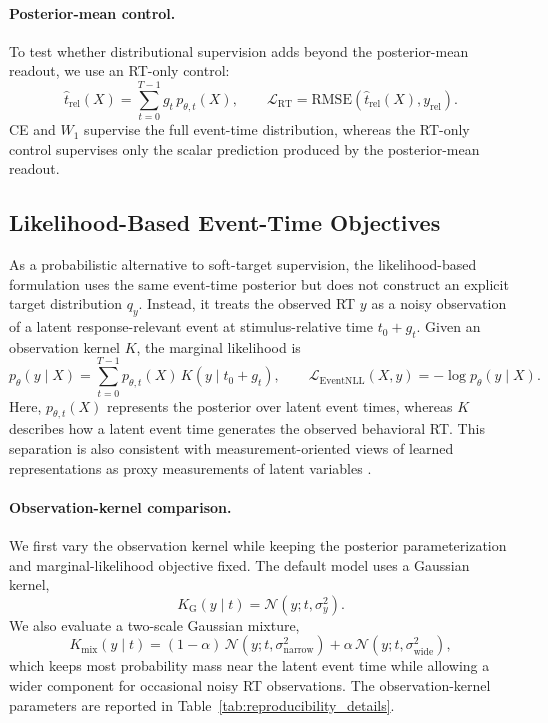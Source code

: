 \documentclass[12pt]{article}
\begin{document}
\paragraph{Posterior-mean control.}
To test whether distributional supervision adds beyond the posterior-mean
readout, we use an RT-only control:
\begin{equation}
\hat t_{\mathrm{rel}}(X)
=\sum_{t=0}^{T-1}g_t\,p_{\theta,t}(X),\qquad
\mathcal{L}_{\mathrm{RT}}
=\mathrm{RMSE}\!\left(\hat t_{\mathrm{rel}}(X),y_{\mathrm{rel}}\right).
\end{equation}
CE and $W_1$ supervise the full event-time distribution, whereas the RT-only
control supervises only the scalar prediction produced by the posterior-mean
readout.

\subsection{Likelihood-Based Event-Time Objectives}
\label{sec:event_nll}

As a probabilistic alternative to soft-target supervision, the likelihood-based
formulation uses the same event-time posterior but does not construct an explicit
target distribution $q_y$. Instead, it treats the observed RT $y$ as a noisy
observation of a latent response-relevant event at stimulus-relative time
$t_0+g_t$. Given an observation kernel $K$, the marginal likelihood is
\begin{equation}
\label{eq:event_nll}
p_\theta(y\mid X)
=\sum_{t=0}^{T-1}p_{\theta,t}(X)\,
K\!\left(y\mid t_0+g_t\right),
\qquad
\mathcal{L}_{\mathrm{EventNLL}}(X,y)
=-\log p_\theta(y\mid X).
\end{equation}
Here, $p_{\theta,t}(X)$ represents the posterior over latent event times, whereas
$K$ describes how a latent event time generates the observed behavioral RT. This
separation is also consistent with measurement-oriented views of learned
representations as proxy measurements of latent variables
\citep{Yao2025ThirdPillar}.

\paragraph{Observation-kernel comparison.}
We first vary the observation kernel while keeping the posterior parameterization
and marginal-likelihood objective fixed. The default model uses a Gaussian kernel,
\begin{equation}
K_{\mathrm{G}}(y\mid t)=\mathcal{N}(y;t,\sigma_y^2).
\end{equation}
We also evaluate a two-scale Gaussian mixture,
\begin{equation}
\label{eq:event_nll_mixture_kernel}
K_{\mathrm{mix}}(y\mid t)
=(1-\alpha)\,\mathcal{N}(y;t,\sigma_{\mathrm{narrow}}^2)
+\alpha\,\mathcal{N}(y;t,\sigma_{\mathrm{wide}}^2),
\end{equation}
which keeps most probability mass near the latent event time while allowing a
wider component for occasional noisy RT observations. The observation-kernel
parameters are reported in Table~\ref{tab:reproducibility_details}.
\end{document}

